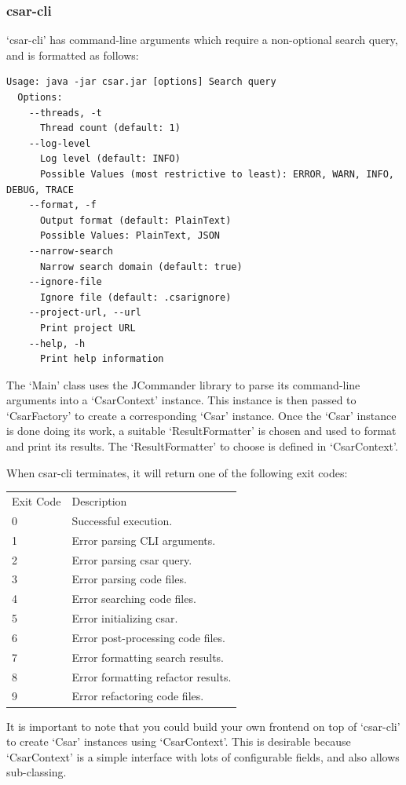 \documentclass[12pt, letterpaper]{article}
\begin{document}
\subsubsection{csar-cli}
\label{sec:DesignCsarCli}
`csar-cli' has command-line arguments which require a non-optional search query, and is formatted as follows:
\begin{lstlisting}
Usage: java -jar csar.jar [options] Search query
  Options:
    --threads, -t
      Thread count (default: 1)
    --log-level
      Log level (default: INFO)
      Possible Values (most restrictive to least): ERROR, WARN, INFO, DEBUG, TRACE
    --format, -f
      Output format (default: PlainText)
      Possible Values: PlainText, JSON
    --narrow-search
      Narrow search domain (default: true)
    --ignore-file
      Ignore file (default: .csarignore)
    --project-url, --url
      Print project URL
    --help, -h
      Print help information
\end{lstlisting}

The `Main' class uses the JCommander library to parse its command-line arguments into a `CsarContext' instance.
This instance is then passed to `CsarFactory' to create a corresponding `Csar' instance.
Once the `Csar' instance is done doing its work, a suitable `ResultFormatter' is chosen and used to format and print its results.
The `ResultFormatter' to choose is defined in `CsarContext'.

When csar-cli terminates, it will return one of the following exit codes:

\begin{tabular}{ l l }
  Exit Code & Description \\
  0 & Successful execution. \\
  1 & Error parsing CLI arguments. \\
  2 & Error parsing csar query. \\
  3 & Error parsing code files. \\
  4 & Error searching code files. \\
  5 & Error initializing csar. \\
  6 & Error post-processing code files. \\
  7 & Error formatting search results. \\
  8 & Error formatting refactor results. \\
  9 & Error refactoring code files. \\
\end{tabular}

It is important to note that you could build your own frontend on top of `csar-cli' to create `Csar' instances using `CsarContext'.
This is desirable because `CsarContext' is a simple interface with lots of configurable fields, and also allows sub-classing.
\end{document}
